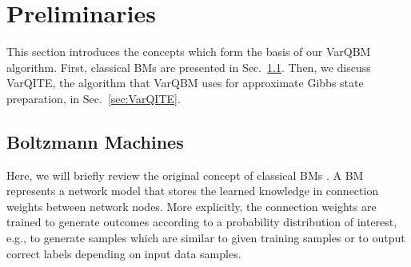 \documentclass[twocolumn, aps, pra, superscriptaddress, floatfix]{revtex4}
\newcommand{\varqbm}{VarQBM}
\begin{document}
\section{Preliminaries}
\label{sec:pre}

This section introduces the concepts which form the basis of our \varqbm{} algorithm. First, classical BMs are presented in Sec.~\ref{sec:classBM}. Then, we discuss VarQITE, the algorithm that \varqbm{} uses for approximate Gibbs state preparation, in Sec.~\ref{sec:VarQITE}.

\subsection{Boltzmann Machines}
\label{sec:classBM}

Here, we will briefly review the original concept of classical BMs \cite{HintonBM1985}.
A BM represents a network model that stores the learned knowledge in connection weights between network nodes. 
More explicitly, the connection weights are trained to generate outcomes according to a probability distribution of interest, e.g., to generate samples which are similar to given training samples or to output correct labels depending on input data samples. 
\end{document}
